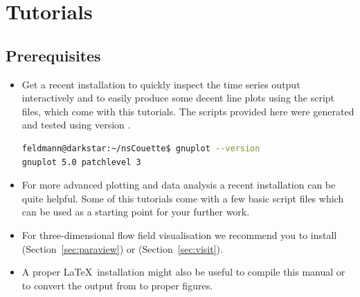 \documentclass[a4paper, 11pt, DIV=11]{scrartcl}
\begin{document}
\section{Tutorials}
\label{sec:tutorials}

\subsection{Prerequisites}
\begin{itemize}
\item
Get a recent \gnuplot installation to quickly inspect the time series output
interactively and to easily produce some decent line plots using the 
script files, which come with this tutorials. The scripts provided here were
generated and tested using version .
\begin{lstlisting}[language=bash]
feldmann@darkstar:~/nsCouette$ gnuplot --version
gnuplot 5.0 patchlevel 3
\end{lstlisting}
\item
For more advanced plotting and data analysis a recent \python installation can be
quite helpful. Some of this tutorials come with a few basic  script files
which can be used as a starting point for your further work.
\item
For three-dimensional flow field visualisation we recommend you to install \paraview
(Section~\ref{sec:paraview}) or \visit (Section~\ref{sec:visit}).
\item
A proper \LaTeX~installation might also be useful \eg to compile this manual or to convert
the  output from \gnuplot to proper  figures.
\end{itemize}
\end{document}
